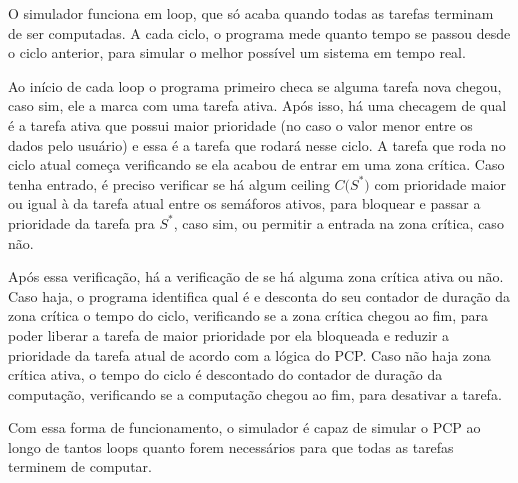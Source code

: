 O simulador funciona em loop, que só acaba quando todas as tarefas terminam de ser computadas. A cada ciclo, o programa mede quanto tempo se passou desde o ciclo anterior, para simular o melhor possível um sistema em tempo real.

Ao início de cada loop o programa primeiro checa se alguma tarefa nova chegou, caso sim, ele a marca com uma tarefa ativa. Após isso, há uma checagem de qual é a tarefa ativa que possui maior prioridade (no caso o valor menor entre os dados pelo usuário) e essa é a tarefa que rodará nesse ciclo.
A tarefa que roda no ciclo atual começa verificando se ela acabou de entrar em uma zona crítica. Caso tenha entrado, é preciso verificar se há algum ceiling $\textit{C($S^{*}$)}$ com prioridade maior ou igual à da tarefa atual entre os semáforos ativos, para bloquear e passar a prioridade da tarefa pra $\textit{$S^{*}$}$, caso sim, ou permitir a entrada na zona crítica, caso não.

Após essa verificação, há a verificação de se há alguma zona crítica ativa ou não. Caso haja, o programa identifica qual é e desconta do seu contador de duração da zona crítica o tempo do ciclo, verificando se a zona crítica chegou ao fim, para poder liberar a tarefa de maior prioridade por ela bloqueada e reduzir a prioridade da tarefa atual de acordo com a lógica do PCP. Caso não haja zona crítica ativa, o tempo do ciclo é descontado do contador de duração da computação, verificando se a computação chegou ao fim, para desativar a tarefa.

Com essa forma de funcionamento, o simulador é capaz de simular o PCP ao longo de tantos loops quanto forem necessários para que todas as tarefas terminem de computar.
